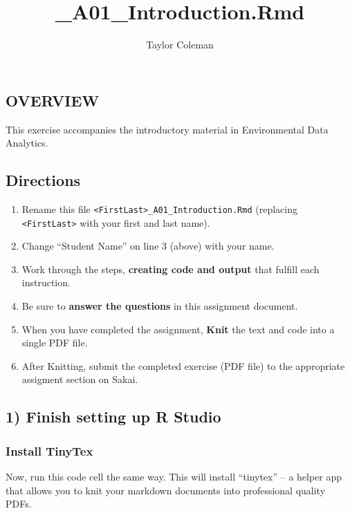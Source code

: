 \documentclass[
]{article}
\title{\_A01\_Introduction.Rmd}
\author{Taylor Coleman}
\date{}
\providecommand{\tightlist}{%
  \setlength{\itemsep}{0pt}\setlength{\parskip}{0pt}}
\begin{document}
\maketitle

\hypertarget{overview}{%
\subsection{OVERVIEW}\label{overview}}

This exercise accompanies the introductory material in Environmental
Data Analytics.

\hypertarget{directions}{%
\subsection{Directions}\label{directions}}

\begin{enumerate}
\def\labelenumi{\arabic{enumi}.}
\tightlist
\item
  Rename this file
  \texttt{\textless{}FirstLast\textgreater{}\_A01\_Introduction.Rmd}
  (replacing \texttt{\textless{}FirstLast\textgreater{}} with your first
  and last name).
\item
  Change ``Student Name'' on line 3 (above) with your name.
\item
  Work through the steps, \textbf{creating code and output} that fulfill
  each instruction.
\item
  Be sure to \textbf{answer the questions} in this assignment document.
\item
  When you have completed the assignment, \textbf{Knit} the text and
  code into a single PDF file.
\item
  After Knitting, submit the completed exercise (PDF file) to the
  appropriate assigment section on Sakai.
\end{enumerate}

\hypertarget{finish-setting-up-r-studio}{%
\subsection{1) Finish setting up R
Studio}\label{finish-setting-up-r-studio}}

\hypertarget{install-tinytex}{%
\subsubsection{Install TinyTex}\label{install-tinytex}}

Now, run this code cell the same way. This will install ``tinytex'' -- a
helper app that allows you to knit your markdown documents into
professional quality PDFs.
\end{document}
